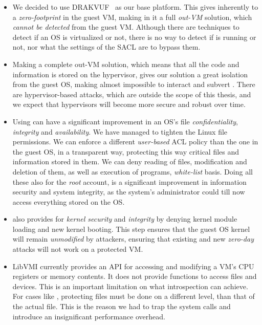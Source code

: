 \begin{itemize}
\item We decided to use DRAKVUF~\cite{lengyel2014drakvuf} as our base platform. This gives inherently to  a \emph{zero-footprint} in the guest \ac{VM}, making in it a full \emph{out-\ac{VM}} solution, which \emph{cannot be detected} from the guest \ac{VM}. Although there are techniques to detect if an \ac{OS} is virtualized or not, there is no way to detect if  is running or not, nor what the settings of the \ac{SACL} are to bypass them.

\item Making  a complete out-\ac{VM} solution, which means that all the code and information is stored on the hypervisor, gives our solution a great isolation from the guest \ac{OS}, making almost impossible to interact and subvert . There are hypervisor-based attacks, which are outside the scope of this thesis, and we expect that hypervisors will become more secure and robust over time.

\item Using  can have a significant improvement in an \ac{OS}'s file \emph{confidentiality}, \emph{integrity} and \emph{availability}. We have managed to tighten the Linux file permissions. We can enforce a different \emph{user-based}  \ac{ACL} policy than the one in the guest \ac{OS}, in a transparent way, protecting this way critical files and information stored in them. We can deny reading of files, modification and deletion of them, as well as execution of programs,  \emph{white-list} basis. Doing all these also for the \emph{root} account, is a significant improvement in information security and system integrity, as the system's administrator could till now access everything stored on the \ac{OS}.

\item {} also provides for \emph{kernel security} and \emph{integrity} by denying kernel module loading and new kernel booting. This step ensures that the guest \ac{OS} kernel will remain \emph{unmodified} by attackers, ensuring that existing and new \emph{zero-day} attacks will not work on a  protected \ac{VM}.

\item LibVMI currently provides an \ac{API} for accessing and modifying a \ac{VM}'s \ac{CPU} registers or memory contents. It does not provide functions to access files and devices. This is an important limitation on what introspection can achieve. For cases like , protecting files must be done on a different level, than that of the actual file. This is the reason we had to trap the system calls and introduce an insignificant performance overhead.


\end{itemize}
